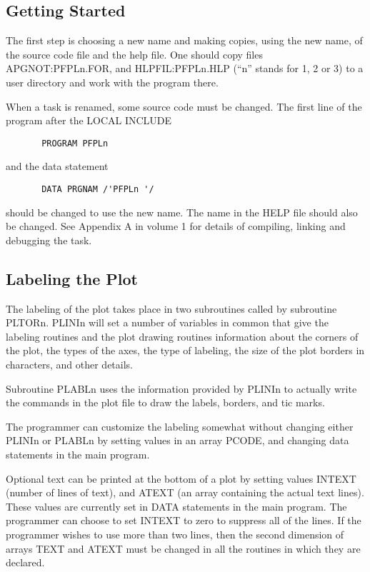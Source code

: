 \subsection{Getting Started}
The first step is choosing a new name and making copies, using the new
name, of the source code file and the help file.  One
should copy files APGNOT:PFPLn.FOR, and HLPFIL:PFPLn.HLP (``n'' stands
for 1, 2 or 3) to a user directory and work with the program there.

When a task is renamed, some source code must be changed.  The first
line of the program after the LOCAL INCLUDE
\begin{verbatim}
       PROGRAM PFPLn
\end{verbatim}
and the data statement
\begin{verbatim}
       DATA PRGNAM /'PFPLn '/
\end{verbatim}
should be changed to use the new name. The name in the HELP file
should also be changed.  See Appendix A in volume 1 for details of
compiling, linking and debugging the task.

\smallskip

\subsection{Labeling the Plot}
The labeling of the plot takes place in two subroutines called by
subroutine PLTORn. PLINIn will set a number of variables in common
that give the labeling routines and the plot drawing routines
information about the corners of the plot, the types of the axes, the
type of labeling, the size of the plot borders in characters, and
other details.

Subroutine PLABLn uses the information provided by PLINIn to actually
write the commands in the plot file to draw the labels, borders, and
tic marks.

The programmer can customize the labeling somewhat without changing
either PLINIn or PLABLn by setting values in an array PCODE, and
changing data statements in the main program.

Optional text can be printed at the bottom of a plot by setting values
INTEXT (number of lines of text), and ATEXT (an array containing the
actual text lines).  These values are currently set in DATA statements
in the main program.  The programmer can choose to set INTEXT to zero
to suppress all of the lines.  If the programmer wishes to use more
than two lines, then the second dimension of arrays TEXT and ATEXT
must be changed in all the routines in which they are declared.

